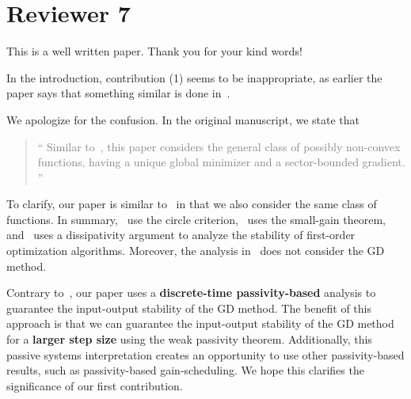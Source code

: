\section*{Reviewer 7}\label{sec:reviewer7}
\renewcommand{\theequation}{R7.\arabic{equation}}
\setcounter{equation}{0}
\begin{rebuttal}
    {%
        This is a well written paper.
    }%
    {%
        Thank you for your kind words!
    }%
\end{rebuttal}
\begin{rebuttal}
    {%
        In the introduction, contribution (1) seems to be inappropriate, as earlier the paper says that something similar is done in~\cite{ugrinovskii,alex_petersen,hu_lessard,lessard_dissipativity}.
    }%
    {%
        We apologize for the confusion. In the original manuscript, we state that 
        \begin{quote}\textcolor{gray}{\enquote{%
            Similar to~\cite{ugrinovskii,alex_petersen,hu_lessard,lessard_dissipativity}, this paper considers the general class of possibly non-convex functions, having a unique global minimizer and a sector-bounded gradient.%
            }}%
        \end{quote}
        To clarify, our paper is similar to~\cite{ugrinovskii,alex_petersen,hu_lessard,lessard_dissipativity} in that we also consider the same class of functions. In summary,~\cite{ugrinovskii,alex_petersen} use the circle criterion,~\cite{hu_lessard} uses the small-gain theorem, and~\cite{lessard_dissipativity} uses a dissipativity argument to analyze the stability of first-order optimization algorithms. Moreover, the analysis in~\cite{ugrinovskii,alex_petersen} does not consider the GD method. 
        
        Contrary to~\cite{ugrinovskii,alex_petersen,hu_lessard,lessard_dissipativity}, our paper uses a \textbf{discrete-time passivity-based} analysis to guarantee the input-output stability of the GD method. The benefit of this approach is that we can guarantee the input-output stability of the GD method for a \textbf{larger step size} using the weak passivity theorem. Additionally, this passive systems interpretation creates an opportunity to use other passivity-based results, such as passivity-based gain-scheduling. We hope this clarifies the significance of our first contribution.
    }%
\end{rebuttal}

